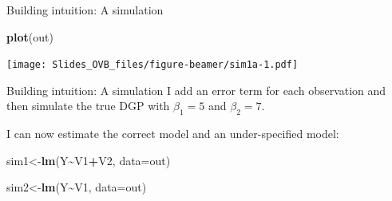 \documentclass[
  ignorenonframetext,
]{beamer}
\newenvironment{Shaded}{\begin{snugshade}}{\end{snugshade}}
\newcommand{\DataTypeTok}[1]{\textcolor[rgb]{0.13,0.29,0.53}{#1}}
\newcommand{\DecValTok}[1]{\textcolor[rgb]{0.00,0.00,0.81}{#1}}
\newcommand{\KeywordTok}[1]{\textcolor[rgb]{0.13,0.29,0.53}{\textbf{#1}}}
\newcommand{\NormalTok}[1]{#1}
\newcommand{\OperatorTok}[1]{\textcolor[rgb]{0.81,0.36,0.00}{\textbf{#1}}}
\begin{document}
\begin{frame}[fragile]{Building intuition: A simulation}
\protect\hypertarget{building-intuition-a-simulation-1}{}
\begin{Shaded}
\begin{Highlighting}[]
\KeywordTok{plot}\NormalTok{(out)}
\end{Highlighting}
\end{Shaded}

\texttt{[image: Slides\_OVB\_files/figure-beamer/sim1a-1.pdf]}
\end{frame}

\begin{frame}[fragile]{Building intuition: A simulation}
\protect\hypertarget{building-intuition-a-simulation-2}{}
I add an error term for each observation and then simulate the true DGP
with \(\beta_1=5\) and \(\beta_2=7\).

\tiny

\begin{Shaded}
\end{Shaded}

\normalsize

I can now estimate the correct model and an under-specified model:

\tiny

\begin{Shaded}
\begin{Highlighting}[]
\NormalTok{sim1\textless{}{-}}\KeywordTok{lm}\NormalTok{(Y}\OperatorTok{\textasciitilde{}}\NormalTok{V1}\OperatorTok{+}\NormalTok{V2, }\DataTypeTok{data=}\NormalTok{out)}

\NormalTok{sim2\textless{}{-}}\KeywordTok{lm}\NormalTok{(Y}\OperatorTok{\textasciitilde{}}\NormalTok{V1, }\DataTypeTok{data=}\NormalTok{out)}
\end{Highlighting}
\end{Shaded}

\normalsize
\end{frame}
\end{document}
